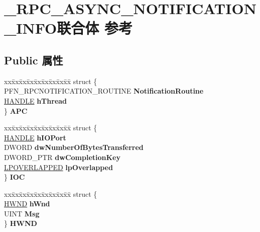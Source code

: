 \hypertarget{union___r_p_c___a_s_y_n_c___n_o_t_i_f_i_c_a_t_i_o_n___i_n_f_o}{}\section{\+\_\+\+R\+P\+C\+\_\+\+A\+S\+Y\+N\+C\+\_\+\+N\+O\+T\+I\+F\+I\+C\+A\+T\+I\+O\+N\+\_\+\+I\+N\+F\+O联合体 参考}
\label{union___r_p_c___a_s_y_n_c___n_o_t_i_f_i_c_a_t_i_o_n___i_n_f_o}
\subsection*{Public 属性}
\begin{DoxyCompactItemize}
\item 
\mbox{\label{union___r_p_c___a_s_y_n_c___n_o_t_i_f_i_c_a_t_i_o_n___i_n_f_o_adc58264bff8af504013d956704cf26b1}} 
\begin{tabbing}
xx\=xx\=xx\=xx\=xx\=xx\=xx\=xx\=xx\=\kill
struct \{\\
\>PFN\_RPCNOTIFICATION\_ROUTINE {\bfseries NotificationRoutine}\\
\>\hyperlink{interfacevoid}{HANDLE} {\bfseries hThread}\\
\} {\bfseries APC}\\

\end{tabbing}\item 
\mbox{\label{union___r_p_c___a_s_y_n_c___n_o_t_i_f_i_c_a_t_i_o_n___i_n_f_o_a4fb7b9d74a1ac1fededfd37231c868e7}} 
\begin{tabbing}
xx\=xx\=xx\=xx\=xx\=xx\=xx\=xx\=xx\=\kill
struct \{\\
\>\hyperlink{interfacevoid}{HANDLE} {\bfseries hIOPort}\\
\>DWORD {\bfseries dwNumberOfBytesTransferred}\\
\>DWORD\_PTR {\bfseries dwCompletionKey}\\
\>\hyperlink{struct___o_v_e_r_l_a_p_p_e_d}{LPOVERLAPPED} {\bfseries lpOverlapped}\\
\} {\bfseries IOC}\\

\end{tabbing}\item 
\mbox{\label{union___r_p_c___a_s_y_n_c___n_o_t_i_f_i_c_a_t_i_o_n___i_n_f_o_a67a1f7933f87a8691eaea18577e0b8c4}} 
\begin{tabbing}
xx\=xx\=xx\=xx\=xx\=xx\=xx\=xx\=xx\=\kill
struct \{\\
\>\hyperlink{interfacevoid}{HWND} {\bfseries hWnd}\\
\>UINT {\bfseries Msg}\\
\} {\bfseries HWND}\\


\end{tabbing}
\end{DoxyCompactItemize}
